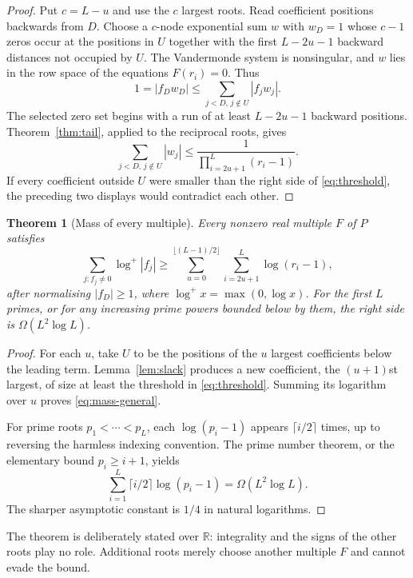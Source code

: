 \documentclass[11pt]{article}
\newtheorem{theorem}{Theorem}[section]
\theoremstyle{definition}
\theoremstyle{remark}
\newcommand{\R}{\mathbb R}
\begin{document}
\begin{proof}
Put $c=L-u$ and use the $c$ largest roots.  Read coefficient positions
backwards from $D$.  Choose a $c$-node exponential sum $w$ with $w_D=1$
whose $c-1$ zeros occur at the positions in $U$ together with the first
$L-2u-1$ backward distances not occupied by $U$.  The Vandermonde system is
nonsingular, and $w$ lies in the row space of the equations $F(r_i)=0$.
Thus
\[
  1=|f_Dw_D|
   \le\sum_{j<D,\,j\notin U}|f_jw_j|.
\]
The selected zero set begins with a run of at least $L-2u-1$ backward
positions.  Theorem~\ref{thm:tail}, applied to the reciprocal roots, gives
\[
  \sum_{j<D,\,j\notin U}|w_j|
  \le\frac{1}{\prod_{i=2u+1}^{L}(r_i-1)}.
\]
If every coefficient outside $U$ were smaller than the right side of
\eqref{eq:threshold}, the preceding two displays would contradict each
other.
\end{proof}

\begin{theorem}[Mass of every multiple]\label{thm:mass}
Every nonzero real multiple $F$ of $P$ satisfies
\begin{equation}\label{eq:mass-general}
  \sum_{j:f_j\ne0}\log^+|f_j|
  \ge \sum_{u=0}^{\lfloor(L-1)/2\rfloor}
       \sum_{i=2u+1}^{L}\log(r_i-1),
\end{equation}
after normalising $|f_D|\ge1$, where $\log^+x=\max(0,\log x)$.
For the first $L$ primes, or for any increasing prime powers bounded below
by them, the right side is $\Omega(L^2\log L)$.
\end{theorem}

\begin{proof}
For each $u$, take $U$ to be the positions of the $u$ largest coefficients
below the leading term.  Lemma~\ref{lem:slack} produces a new coefficient,
the $(u+1)$st largest, of size at least the threshold in
\eqref{eq:threshold}.  Summing its logarithm over $u$ proves
\eqref{eq:mass-general}.

For prime roots $p_1<\cdots<p_L$, each $\log(p_i-1)$ appears
$\lceil i/2\rceil$ times, up to reversing the harmless indexing convention.
The prime number theorem, or the elementary bound $p_i\ge i+1$, yields
\[
  \sum_{i=1}^{L}\lceil i/2\rceil\log(p_i-1)
  =\Omega(L^2\log L).
\]
The sharper asymptotic constant is $1/4$ in natural logarithms.
\end{proof}

The theorem is deliberately stated over $\R$: integrality and the signs of
the other roots play no role.  Additional roots merely choose another
multiple $F$ and cannot evade the bound.
\end{document}
